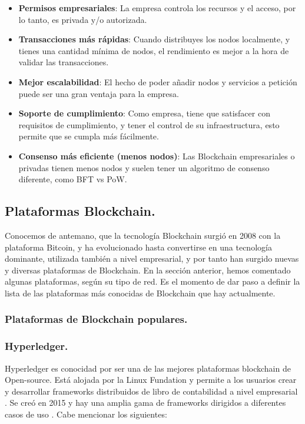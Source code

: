 \begin{itemize}
\item \textbf{Permisos empresariales}: La empresa controla los recursos y el acceso, por lo tanto, es privada y/o 
autorizada.

\item \textbf{Transacciones más rápidas}: Cuando distribuyes los nodos localmente, y tienes una cantidad mínima de 
nodos, el rendimiento es mejor a la hora de validar las transacciones.

\item \textbf{Mejor escalabilidad}: El hecho de poder añadir nodos y servicios a petición puede ser una gran ventaja 
para la empresa.

\item \textbf{Soporte de cumplimiento}: Como empresa, tiene que satisfacer con requisitos de cumplimiento, y tener el 
control de su infraestructura, esto permite que se cumpla más fácilmente.

\item \textbf{Consenso más eficiente (menos nodos)}: Las Blockchain empresariales o privadas tienen menos nodos y 
suelen tener un algoritmo de consenso diferente, como BFT vs PoW.
\end{itemize}

\subsection{Plataformas Blockchain.}

Conocemos de antemano, que la tecnología Blockchain surgió en 2008 con la plataforma Bitcoin, y ha evolucionado hasta
convertirse en una tecnología dominante, utilizada también a nivel empresarial, y por tanto han surgido nuevas y 
diversas plataformas de Blockchain. En la sección anterior, hemos comentado algunas plataformas, según su tipo de red.
Es el momento de dar paso a definir la lista de las plataformas más conocidas de Blockchain que hay actualmente.

\subsubsection{Plataformas de Blockchain populares.}

\subsubsection*{Hyperledger.}

Hyperledger es conocidad por ser una de las mejores plataformas blockchain de Open-source. Está alojada por la Linux 
Fundation y permite a los usuarios crear y desarrollar frameworks distribuidos de libro de contabilidad a nivel 
empresarial \cite{top-blockchain-platforms}. Se creó en 2015 y hay una amplia gama de frameworks dirigidos a diferentes 
casos de uso \cite{top-blockchain-platforms-app}. Cabe mencionar los siguientes: 
    
